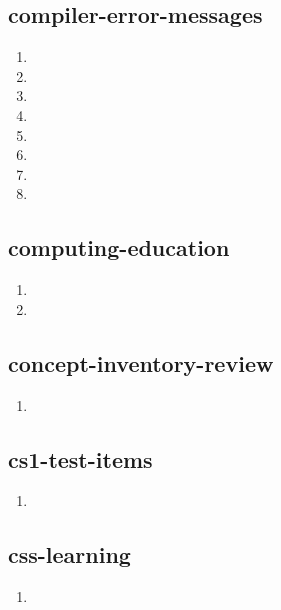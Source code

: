\documentclass{article}
\begin{document}
\subsection{compiler-error-messages}
\begin{enumerate}
\item {}
\item {}
\item {}
\item {}
\item {}
\item {}
\item {}
\item {}
\end{enumerate}

\subsection{computing-education}
\begin{enumerate}
\item {}
\item {}
\end{enumerate}

\subsection{concept-inventory-review}
\begin{enumerate}
\item {}
\end{enumerate}

\subsection{cs1-test-items}
\begin{enumerate}
\item {}
\end{enumerate}

\subsection{css-learning}
\begin{enumerate}
\item {}
\end{enumerate}
\end{document}
